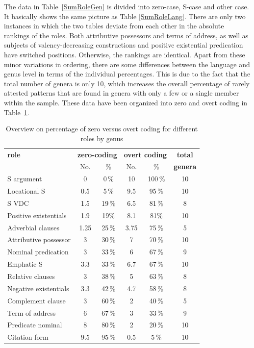 The data in Table~\ref{SumRoleGen} is divided into zero-case, S-case and other case. 
It basically shows the same picture as Table \ref{SumRoleLang}. 
There are only two instances in which the two tables deviate from each other in the absolute rankings of the roles. 
Both attributive possessors and terms of address, as well as subjects of valency-decreasing constructions and positive existential predication have switched positions.
Otherwise, the rankings are identical.
Apart from these minor variations in ordering, there are some differences between the language and genus level in terms of the individual percentages. 
This is due to the fact that the total number of genera is only 10, which increases the overall percentage of rarely attested patterns that are found in genera with only a few or a single member within the sample. 
These data have been organized into zero and overt coding in Table~\ref{SumRoleGenOvert}.

\begin{table}[t,b,h]
\centering
{\caption{Overview on percentage of zero versus overt coding for different roles by genus}\label{SumRoleGenOvert}
\begin{tabular}{lccccc}
\hline \hline
\bfseries role &\multicolumn{2}{c}{\bfseries zero-coding} &\multicolumn{2}{c}{\bfseries overt coding} &\bfseries total \\
{}& No.& \% &No. & \% & \bfseries genera \\
\hline
S argument &0  &0\,\% &10  &100\,\%  & 10\\
Locational S &0.5  &5\,\% &9.5  &95\,\% &10\\
S VDC&1.5  &19\,\% &6.5  &81\,\% &8\\
Positive existentials&1.9  &19\% &8.1  &81\% &10\\
Adverbial clauses&1.25  &25\,\% &3.75  &75\,\% &5\\
Attributive possessor&3  &30\,\% &7  &70\,\% &10\\
Nominal predication&3  &33\,\% &6  &67\,\% &9\\
Emphatic S&3.3  &33\,\% &6.7  &67\,\% &10\\
Relative clauses&3  &38\,\% &5  &63\,\% &8\\
Negative existentials&3.3  &42\,\% &4.7  &58\,\% &8\\
Complement clause&3  &60\,\% &2  &40\,\% &5\\
Term of address&6  &67\,\% &3  &33\,\% &9\\
Predicate nominal&8  &80\,\% &2  &20\,\% &10\\
Citation form&9.5  &95\,\% &0.5  &5\,\% &10\\
\hline \hline
\end{tabular}
}
\end{table}

